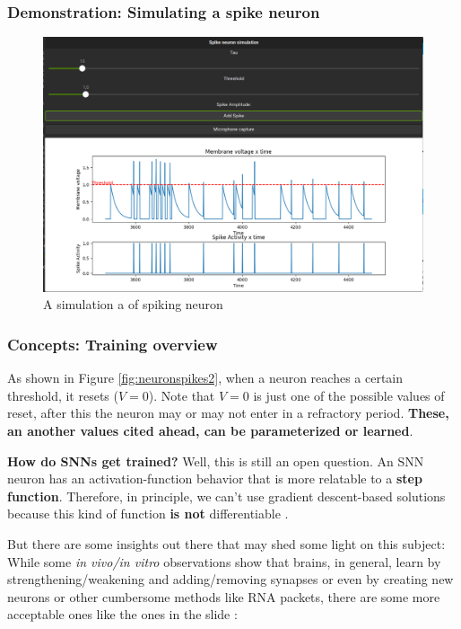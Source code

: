 \begin{frame}[allowframebreaks]
	\frametitle{Demonstration: Simulating a spike neuron}
	\begin{figure}
		\centering
		\includegraphics[width=0.6\linewidth]{images/spikeNeuronSimulation}
		\caption[Spiking Neuron Simulator]{A simulation a of spiking neuron}
		\label{fig:spikeneuronsimulation}
	\end{figure}
\end{frame}

\begin{frame}
	\frametitle{Concepts: Training overview}
	\par As shown in Figure \ref{fig:neuronspikes2}, when a neuron reaches a certain threshold, it resets ($V = 0$). Note that $V=0$ is just one of the possible values of reset, after this the neuron may or may not enter in a refractory period. \textbf{These, an another values cited ahead, can be parameterized or learned}.\newline
	
	\par \textbf{How do SNNs get trained?} Well, this is still an open question. An SNN neuron has an activation-function behavior that is more relatable to a \textbf{step function}. Therefore, in principle, we can't use gradient descent-based solutions because this kind of function \textbf{is not} differentiable \cite{kasabov2019time}.\newline
	
	\par But there are some insights out there that may shed some light on this subject: While some \textit{in vivo/in vitro} observations show that brains, in general, learn by strengthening/weakening and adding/removing synapses or even by creating new neurons or other cumbersome methods like RNA packets, there are some more acceptable ones like the ones in the slide \cite{kasabov2019time}:

\end{frame}

